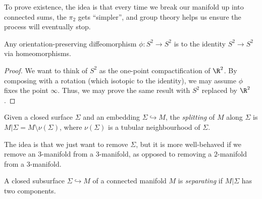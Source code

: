 \documentclass[a4paper]{article}
\begin{document}
\begin{thm}
\end{thm}

\begin{thm}

\end{thm}
To prove existence, the idea is that every time we break our manifold up into connected sums, the $\pi_2$ gets ``simpler'', and group theory helps us ensure the process will eventually stop.

\begin{thm}
  Any orientation-preserving diffeomorphism $\phi: S^2 \to S^2$ is  to the identity $S^2 \to S^2$ via homeomorphisms.
\end{thm}

\begin{proof}
  We want to think of $S^2$ as the one-point compactification of $\R^2$. By composing with a rotation (which isotopic to the identity), we may assume $\phi$ fixes the point $\infty$. Thus, we may prove the same result with $S^2$ replaced by $\R^2$.

\end{proof}



\begin{defi}[Splitting]
  Given a closed surface $\Sigma$ and an embedding $\Sigma \hookrightarrow M$, the \emph{splitting} of $M$ along $\Sigma$ is $M | \Sigma = M \setminus \nu(\Sigma)$, where $\nu(\Sigma)$ is a tubular neighbourhood of $\Sigma$.
\end{defi}
The idea is that we just want to remove $\Sigma$, but it is more well-behaved if we remove an $3$-manifold from a $3$-manifold, as opposed to removing a $2$-manifold from a $3$-manifold.

\begin{defi}
  A closed subsurface $\Sigma \hookrightarrow M$ of a connected manifold $M$ is \emph{separating} if $M|\Sigma$ has two components.
\end{defi}
\end{document}
